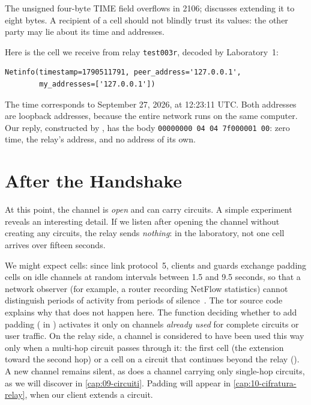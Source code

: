 The unsigned four-byte TIME field overflows in 2106;  discusses extending it to eight bytes. A recipient of a  cell should not blindly trust its values: the other party may lie about its time and addresses.

Here is the  cell we receive from relay \texttt{test003r}, decoded by Laboratory~1:
\begin{lstlisting}[numbers=none]
Netinfo(timestamp=1790511791, peer_address='127.0.0.1',
        my_addresses=['127.0.0.1'])
\end{lstlisting}
The time corresponds to September 27, 2026, at 12:23:11 UTC. Both addresses are loopback addresses, because the entire network runs on the same computer. Our reply, constructed by , has the body \texttt{00000000 04 04 7f000001 00}: zero time, the relay's address, and no address of its own.

\section{After the Handshake}\label{sec:canale-dopo}

At this point, the channel is \emph{open} and can carry circuits. A simple experiment reveals an interesting detail. If we listen after opening the channel without creating any circuits, the relay sends \emph{nothing}: in the laboratory, not one cell arrives over fifteen seconds.

We might expect  cells: since link protocol~5, clients and guards exchange padding cells on idle channels at random intervals between 1.5 and 9.5 seconds, so that a network observer (for example, a router recording NetFlow statistics) cannot distinguish periods of activity from periods of silence~. The tor source code explains why that does not happen here. The function deciding whether to add padding ( in ) activates it only on channels \emph{already used} for complete circuits or user traffic. On the relay side, a channel is considered to have been used this way only when a multi-hop circuit passes through it: the first  cell (the extension toward the second hop) or a  cell on a circuit that continues beyond the relay (). A new channel remains silent, as does a channel carrying only single-hop circuits, as we will discover in \cref{cap:09-circuiti}. Padding will appear in \cref{cap:10-cifratura-relay}, when our client extends a circuit.

